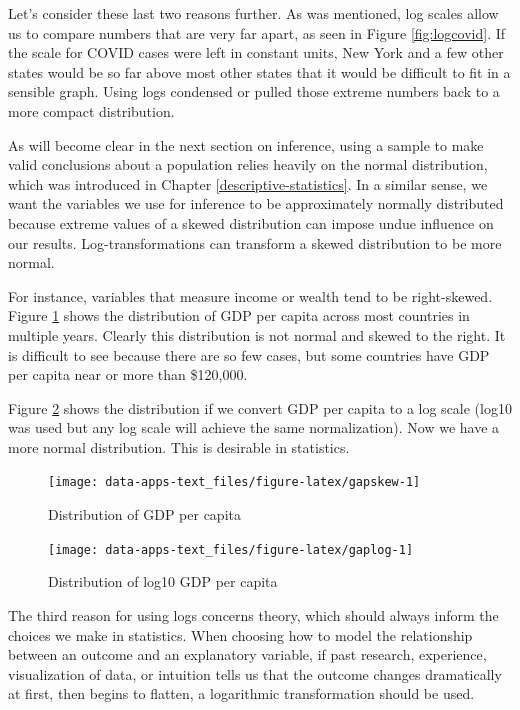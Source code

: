 \documentclass[
]{book}
\begin{document}
Let's consider these last two reasons further. As was mentioned, log scales allow us to compare numbers that are very far apart, as seen in Figure \ref{fig:logcovid}. If the scale for COVID cases were left in constant units, New York and a few other states would be so far above most other states that it would be difficult to fit in a sensible graph. Using logs condensed or pulled those extreme numbers back to a more compact distribution.

As will become clear in the next section on inference, using a sample to make valid conclusions about a population relies heavily on the normal distribution, which was introduced in Chapter \ref{descriptive-statistics}. In a similar sense, we want the variables we use for inference to be approximately normally distributed because extreme values of a skewed distribution can impose undue influence on our results. Log-transformations can transform a skewed distribution to be more normal.

For instance, variables that measure income or wealth tend to be right-skewed. Figure \ref{fig:gapskew} shows the distribution of GDP per capita across most countries in multiple years. Clearly this distribution is not normal and skewed to the right. It is difficult to see because there are so few cases, but some countries have GDP per capita near or more than \$120,000.

Figure \ref{fig:gaplog} shows the distribution if we convert GDP per capita to a log scale (log10 was used but any log scale will achieve the same normalization). Now we have a more normal distribution. This is desirable in statistics.

\begin{figure}

{\centering \texttt{[image: data-apps-text\_files/figure-latex/gapskew-1]} 

}

\caption{Distribution of GDP per capita}\label{fig:gapskew}
\end{figure}

\begin{figure}

{\centering \texttt{[image: data-apps-text\_files/figure-latex/gaplog-1]} 

}

\caption{Distribution of log10 GDP per capita}\label{fig:gaplog}
\end{figure}

The third reason for using logs concerns theory, which should always inform the choices we make in statistics. When choosing how to model the relationship between an outcome and an explanatory variable, if past research, experience, visualization of data, or intuition tells us that the outcome changes dramatically at first, then begins to flatten, a logarithmic transformation should be used.
\end{document}
